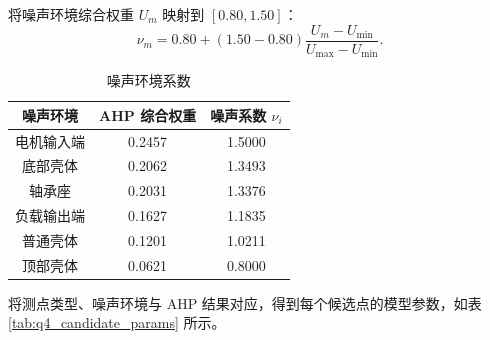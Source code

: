 \documentclass[UTF8,a4paper,12pt]{ctexart}
\numberwithin{figure}{section}
\numberwithin{table}{section}
\begin{document}
将噪声环境综合权重 \(U_m\) 映射到 \([0.80,1.50]\)：
\[
\nu_m=0.80+(1.50-0.80)\frac{U_m-U_{\min}}{U_{\max}-U_{\min}}.
\]

\begin{table}[H]
\centering
\caption{噪声环境系数}
\begin{tabular}{ccc}
\toprule
噪声环境 & AHP 综合权重 & 噪声系数 \(\nu_i\)\\
\midrule
电机输入端 & 0.2457 & 1.5000\\
底部壳体 & 0.2062 & 1.3493\\
轴承座 & 0.2031 & 1.3376\\
负载输出端 & 0.1627 & 1.1835\\
普通壳体 & 0.1201 & 1.0211\\
顶部壳体 & 0.0621 & 0.8000\\
\bottomrule
\end{tabular}
\end{table}

将测点类型、噪声环境与 AHP 结果对应，得到每个候选点的模型参数，如表 \ref{tab:q4_candidate_params} 所示。
\end{document}
